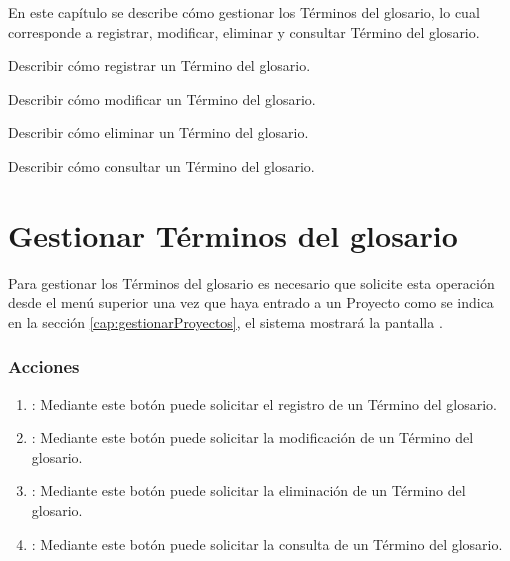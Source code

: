 
En este capítulo se describe cómo gestionar los Términos del glosario, lo cual corresponde a registrar, modificar, eliminar y
consultar Término del glosario.\\


\begin{objetivos}
	\item Describir cómo registrar un Término del glosario.
	\item Describir cómo modificar un Término del glosario.
	\item Describir cómo eliminar un Término del glosario.
	\item Describir cómo consultar un Término del glosario.
\end{objetivos}

\section{Gestionar Términos del glosario}

Para gestionar los Términos del glosario es necesario que solicite esta operación desde el menú superior una vez que haya entrado a un Proyecto como se indica en la sección \ref{cap:gestionarProyectos}, el sistema mostrará la pantalla .


\subsubsection{Acciones}

\begin{enumerate}
	\item {}: Mediante este botón puede solicitar el registro de un Término del glosario.
	\item {}: Mediante este botón puede solicitar la modificación de un Término del glosario.
	\item {}: Mediante este botón puede solicitar la eliminación de un Término del glosario.
	\item {}: Mediante este botón puede solicitar la consulta de un Término del glosario.
\end{enumerate}






